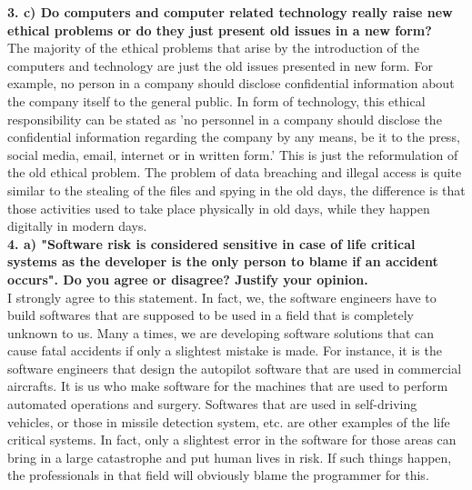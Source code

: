 \documentclass [12pt, a4paper]{article}
\begin{document}
\textbf{3. c) Do computers and computer related technology really raise new ethical problems or do they just present old issues in a new form?}\\
The majority of the ethical problems that arise by the introduction of the computers and technology are just the old issues presented in new form. For example, no person in a company should disclose confidential information about the company itself to the general public. In form of technology, this ethical responsibility can be stated as 'no personnel in a company should disclose the confidential information regarding the company by any means, be it to the press, social media, email, internet or in written form.' This is just the reformulation of the old ethical problem. The problem of data breaching and illegal access is quite similar to the stealing of the files and spying in the old days, the difference is that those activities used to take place physically in old days, while they happen digitally in modern days.\\

\large
\textbf{4. a) "Software risk is considered sensitive in case of life critical systems as the developer is the only person to blame if an accident occurs". Do you agree or disagree? Justify your opinion.} \\
\normalsize
I strongly agree to this statement. In fact, we, the software engineers have to build softwares that are supposed to be used in a field that is completely unknown to us. Many a times, we are developing software solutions that can cause fatal accidents if only a slightest mistake is made. For instance, it is the software engineers that design the autopilot software that are used in commercial aircrafts. It is us who make software for the machines that are used to perform automated operations and surgery. Softwares that are used in self-driving vehicles, or those in missile detection system, etc. are other examples of the life critical systems. In fact, only a slightest error in the software for those areas can bring in a large catastrophe and put human lives in risk. If such things happen, the professionals in that field will obviously blame the programmer for this. 
\end{document}
